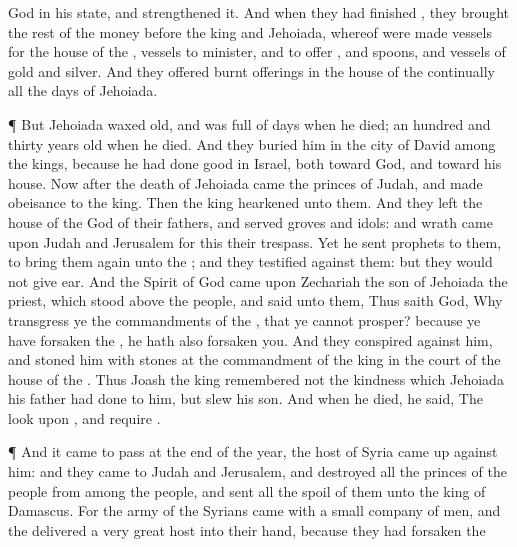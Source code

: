{God in his
state, and
strengthened it.
And when they had
finished
{}, they
brought the
rest of the
money
before the
king and
Jehoiada, whereof were
made
vessels for the
house of the
{},
{}
vessels to
minister, and to
offer
{}, and
spoons, and
vessels of
gold and
silver. And they
offered burnt
offerings in the
house of the
{}
continually all the
days of
Jehoiada.
\par }{\PP {}¶ But
Jehoiada waxed
old, and was
full of
days when he
died; an
hundred and
thirty
years
old
{} when he
died.
And they
buried him in the
city of
David among the
kings, because he had
done
good in
Israel, both toward
God, and toward his
house.
Now
after the
death of
Jehoiada
came the
princes of
Judah, and made
obeisance to the
king. Then the
king
hearkened unto them.
And they
left the
house of the
{}
God of their
fathers, and
served
groves and
idols: and
wrath came upon
Judah and
Jerusalem for this their
trespass.
Yet he
sent
prophets to them, to bring them
again unto the
{}; and they
testified against them: but they would not give
ear.
And the
Spirit of
God
came upon
Zechariah the
son of
Jehoiada the
priest, which
stood above the
people, and
said unto them, Thus
saith
God, Why
transgress ye the
commandments of the
{}, that ye cannot
prosper? because ye have
forsaken the
{}, he hath also
forsaken you.
And they
conspired against him, and
stoned him with
stones at the
commandment of the
king in the
court of the
house of the
{}.
Thus
Joash the
king
remembered not the
kindness which
Jehoiada his
father had
done to him, but
slew his
son. And when he
died, he
said, The
{}
look upon
{}, and
require
{}.
\par }{\PP {}¶ And it came to pass at the
end of the
year,
{} the
host of
Syria came
up against him: and they
came to
Judah and
Jerusalem, and
destroyed all the
princes of the
people from among the
people, and
sent all the
spoil of them unto the
king of
Damascus.
For the
army of the
Syrians
came with a
small company of
men, and the
{}
delivered a
very
great
host into their
hand, because they had
forsaken the
{}
}
